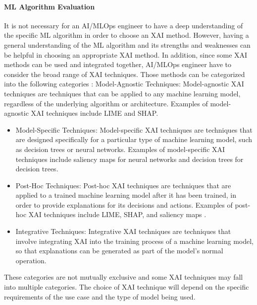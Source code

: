 \documentclass[conference]{IEEEtran}
\begin{document}
\paragraph{ML Algorithm Evaluation} It is not necessary for an AI/MLOps engineer to have a deep understanding of the specific ML algorithm in order to choose an XAI method. However, having a general understanding of the ML algorithm and its strengths and weaknesses can be helpful in choosing an appropriate XAI method. In addition, since some XAI methods can be used and integrated together, AI/MLOps engineer have to consider the broad range of XAI techniques. Those methods can be categorized into the following categories \cite{XAIREF}:
Model-Agnostic Techniques: Model-agnostic XAI techniques are techniques that can be applied to any machine learning model, regardless of the underlying algorithm or architecture. Examples of model-agnostic XAI techniques include LIME and SHAP.
\begin{itemize}
	\item Model-Specific Techniques: Model-specific XAI techniques \cite{XAIREF} are techniques that are designed specifically for a particular type of machine learning model, such as decision trees or neural networks. Examples of model-specific XAI techniques include saliency maps for neural networks and decision trees for decision trees.

	\item Post-Hoc Techniques: Post-hoc XAI techniques \cite{XAIREF} are techniques that are applied to a trained machine learning model after it has been trained, in order to provide explanations for its decisions and actions. Examples of post-hoc XAI techniques include LIME, SHAP, and saliency maps \cite{kadir2001saliency}.

	\item Integrative Techniques: Integrative XAI techniques are techniques that involve integrating XAI into the training process of a machine learning model, so that explanations can be generated as part of the model's normal operation.
\end{itemize}

These categories are not mutually exclusive and some XAI techniques may fall into multiple categories. The choice of XAI technique will depend on the specific requirements of the use case and the type of model being used.
\end{document}
